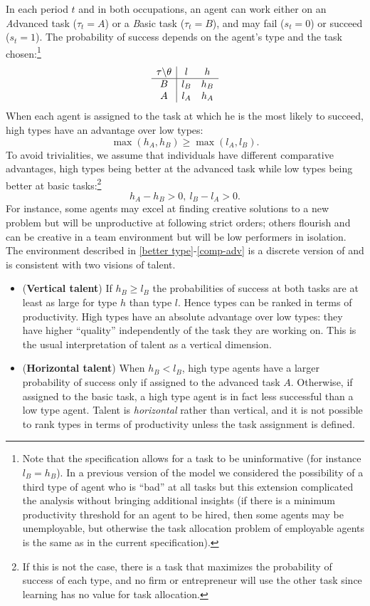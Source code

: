 \documentclass[12pt,american]{paper}
\theoremstyle{remark}
\begin{document}
In each period $t$ and in both occupations, an agent can work either on an \emph{A}dvanced task ($\tau_t=A$) or a \emph{B}asic task ($\tau_t=B$), and may fail ($s_t=0$) or succeed ($s_t=1$). The probability of success depends on the agent's type and the task chosen:\footnote{Note that the specification allows for a task to be uninformative (for instance $l_B=h_B$). In a previous version of the model we considered the possibility of a third type of agent who is ``bad'' at all tasks but this extension complicated the analysis without bringing additional insights (if there is a minimum productivity threshold for an agent to be hired, then some agents may be unemployable, but otherwise the task allocation problem of employable agents is the same as in the current specification).}
\[  
  \begin{array}{  c |c  c }
  \tau\backslash\theta & l & h \\
  \hline
 B & l_B & h_B \\
A & l_A & h_A 
\end{array}
\]
When each agent is assigned to the task at which he is the most likely to succeed, high types have an advantage over low types:
\begin{equation}\label{better type}
\max(h_A,h_B) \geq \max(l_A,l_B).
\end{equation}
To avoid trivialities, we assume that individuals have different comparative advantages, high types being better at the advanced task while low types being better at basic tasks:\footnote{%
If this is not the case, there is a task that maximizes the probability of success of each type, and no firm or entrepreneur will use the other task since learning has no value for task allocation.}
\begin{equation}\label{comp-adv}
h_A-h_B>0, ~  l_B-l_A>0.
\end{equation}
For instance, some agents may excel at finding creative solutions to a new problem but will be unproductive at following strict orders; others flourish and can be creative in a team environment but will be low performers in isolation. The environment described in \eqref{better type}-\eqref{comp-adv} is a discrete version of \cite{macdonald1982information,macdonald1982market} and is consistent with two visions of talent.
\begin{itemize}
\item(\textbf{Vertical talent}) If $h_B \geq l_B$ the probabilities of success at both tasks are at least as large for type $h$ than type $l$. Hence types can be ranked in terms of productivity. High types have  an absolute advantage over low types: they have higher ``quality'' independently of the task they are working on. This is the usual interpretation of talent as a vertical dimension.
\item (\textbf{Horizontal talent}) When $h_B<l_B$, high type agents have a larger probability of success only if assigned to the advanced task $A$. Otherwise, if assigned to the basic task, a high type agent is in fact less successful than a low type agent. Talent is \emph{horizontal} rather than vertical, and it is not possible to rank types in terms of productivity unless the task assignment is defined. 
\end{itemize}
%
\end{document}
